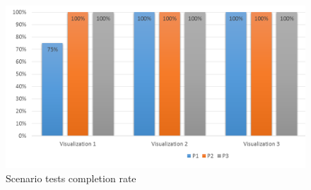 \begin{figure}[H]
\begin{adjustbox}{width=.8\textwidth,center=\textwidth}
  \centering
  \includegraphics[scale=1]{images/scenarios_rate.png}
\end{adjustbox}
  \caption[Scenario tests completion rate]{Scenario tests completion rate}
  \label{fig:automated_tests}
\end{figure}

\newcommand{\specialcell}[2][c]{%
  \begin{tabular}[#1]{@{}l@{}}#2\end{tabular}}

